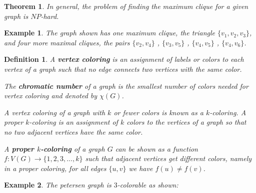 \documentclass[12pt]{article}
\theoremstyle{slplain}
\newtheorem{theorem}{Theorem}
\newtheorem{defi}{Definition}
\newtheorem{exam}{Example}
\begin{document}
\begin{theorem}
In general, the problem of finding the maximum clique for a given graph is $NP$-hard\cite{karp}.
\end{theorem}

\begin{exam}
The graph shown has one maximum clique, the triangle $\{v_1 , v_2 , v_3\}$, and four more maximal cliques, the pairs 
$\{v_2 , v_4\}$ , $\{v_3 , v_5\}$ , $\{v_4 , v_5\}$ , $\{v_4 , v_6\}$.
\vspace{1cm}
\begin{center}
\end{center}
\end{exam}

\begin{defi}
A {\bf vertex coloring} is an assignment of labels or colors to each
vertex of a graph such that no edge connects two vertices with the same color.

The {\bf chromatic number} of a graph is the smallest number of colors needed for
vertex coloring and denoted by $\chi(G)$. 

A vertex coloring of a graph with $k$ or fewer colors is known as a $k$-coloring. A proper $k$-coloring is an assignment of $k$ colors to the vertices of a graph so that no two adjacent vertices have the same color. 

A {\bf proper $k$-coloring} of a graph $G$ can be shown as a function $f: V(G) \to \{1, 2, 3, . . . , k\}$ such that adjacent vertices get different colors, namely in a proper coloring, for all edges $\{u, v\}$ we have $f(u) \not= f(v)$.
\end{defi}


\begin{exam}
The petersen graph is $3$-colorable as shown:
\vspace{1cm}
\begin{center}
\end{center}

\end{exam}
\vspace{0.5cm}
\end{document}
